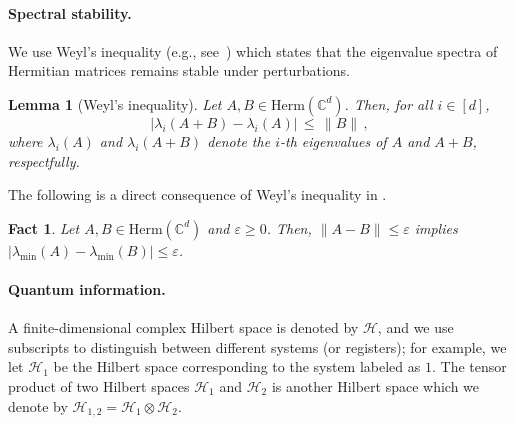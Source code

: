 \documentclass[11pt]{article}
\theoremstyle{plain}
\newtheorem{lemma}[theorem]{Lemma}
\newtheorem{fact}[theorem]{Fact}
\newcommand{\eps}{\varepsilon}
\begin{document}
\paragraph{Spectral stability.} We use Weyl's inequality (e.g., see~\cite{tao2010eigenvalues}) which states that the eigenvalue spectra of Hermitian matrices remains stable under perturbations.

\begin{lemma}[Weyl's inequality]\label{lem:spectral-stab}
Let $A,B \in \mathrm{Herm}(\mathbb{C}^{d})$. Then, for all $i \in [d]$,
$$
\left|\lambda_i(A+B) - \lambda_i(A) \right| \, \leq \, \|B\| \, ,
$$
where $\lambda_i(A)$ and $\lambda_i(A+B)$ denote the $i$-th eigenvalues of $A$ and $A+B$, respectfully.
\end{lemma}

The following is a direct consequence of Weyl's inequality in .
\begin{fact}\label{fact:weyl-corollary}
Let $A,B \in \mathrm{Herm}(\mathbb{C}^{d})$ and $\eps \geq 0$. Then, $\|A - B\| \leq \eps$ implies $|\lambda_{\mathrm{min}}(A) -\lambda_{\mathrm{min}}(B)| \leq \eps$.
\end{fact}

\paragraph{Quantum information.} 
A finite-dimensional complex Hilbert space is denoted by $\mathcal H$, and we use subscripts to distinguish between different systems (or registers); for example, we let $\mathcal H_{1}$ be the Hilbert space corresponding to the system labeled as $1$. 
The tensor product of two Hilbert spaces $\mathcal H_{1}$ and $\mathcal H_{2}$ is another Hilbert space which we denote by $\mathcal H_{1,2} = \mathcal H_{1} \otimes \mathcal H_{2}$.  
\end{document}
